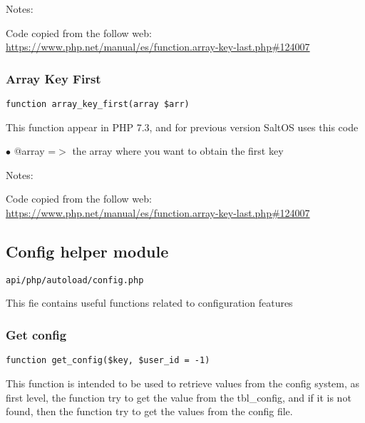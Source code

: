 \documentclass[a4paper]{article}
\def\htmladdnormallink#1#2{\href{#2}{#1}}
\begin{document}
Notes:

Code copied from the follow web:
\htmladdnormallink{https://www.php.net/manual/es/function.array-key-last.php\#124007}{https://www.php.net/manual/es/function.array-key-last.php\#124007}

\hypertarget{toc77}{}
\subsubsection{Array Key First}

\begin{lstlisting}
function array_key_first(array $arr)
\end{lstlisting}

This function appear in PHP 7.3, and for previous version SaltOS
uses this code

\begin{compactitem}
\item[\color{myblue}$\bullet$] @array =$>$ the array where you want to obtain the first key
\end{compactitem}

Notes:

Code copied from the follow web:
\htmladdnormallink{https://www.php.net/manual/es/function.array-key-last.php\#124007}{https://www.php.net/manual/es/function.array-key-last.php\#124007}

\hypertarget{toc78}{}
\subsection{Config helper module}

\begin{lstlisting}
api/php/autoload/config.php
\end{lstlisting}

This fie contains useful functions related to configuration features

\hypertarget{toc79}{}
\subsubsection{Get config}

\begin{lstlisting}
function get_config($key, $user_id = -1)
\end{lstlisting}

This function is intended to be used to retrieve values from the config
system, as first level, the function try to get the value from the
tbl\_config, and if it is not found, then the function try to get the
values from the config file.
\end{document}
